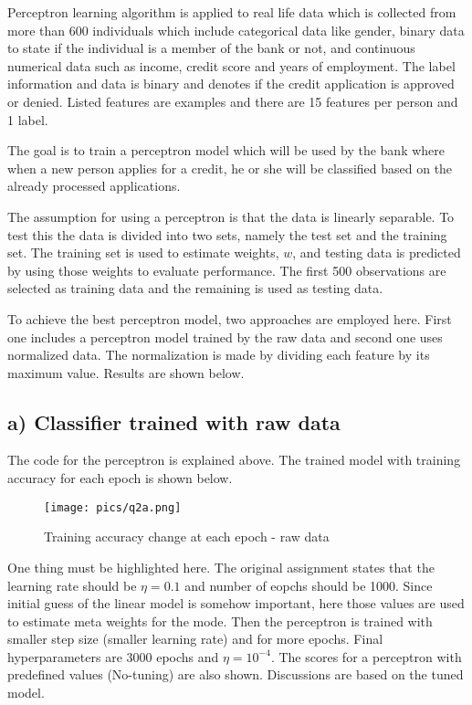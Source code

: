 \documentclass[11pt]{article}
\begin{document}
Perceptron learning algorithm is applied to real life data which is collected from more than 600 individuals which include categorical data like gender, binary data to state if the individual is a member of the bank or not, and continuous numerical data  such as income, credit score and years of employment. The label information and data is binary and denotes if the credit application is approved or denied. Listed features are examples and there are 15 features per person and 1 label.\medskip

The goal is to train a perceptron model which will be used by the bank where when a new person applies for a credit, he or she will be classified based on the already processed applications. \medskip

The assumption for using a perceptron is that the data is linearly separable. To test this the data is divided into two sets, namely the test set and the training set. The training set is used to estimate weights, $w$, and testing data is predicted by using those weights to evaluate performance. The first 500 observations are selected as training data and the remaining is used as testing data.\medskip

To achieve the best perceptron model, two approaches are employed here. First one includes a perceptron model trained by the raw data and second one uses normalized data. The normalization is made by dividing each feature by its maximum value. Results are shown below.

\subsection*{a) Classifier trained with raw data}
The code for the perceptron is explained above. The trained model with training accuracy for each epoch is shown below. 
\begin{figure}[H]
\centering
\texttt{[image: pics/q2a.png]}
\captionsetup{justification=centering}
\caption{Training accuracy change at each epoch - raw data}
\label{fig:q2a_acc}
\end{figure}
One thing must be highlighted here. The original assignment states that the learning rate should be $\eta = 0.1$ and number of eopchs should be 1000. Since initial guess of the linear model is somehow important, here those values are used to estimate meta weights for the mode. Then the perceptron is trained with smaller step size (smaller learning rate) and for more epochs. Final hyperparameters are 3000 epochs and $\eta = 10^{-4}$. The scores for a perceptron with predefined values (No-tuning) are also shown. Discussions are based on the tuned model.
\end{document}
